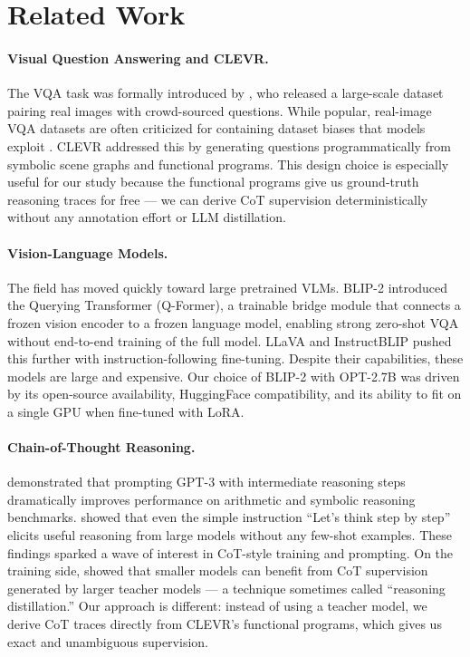 \documentclass[11pt,twocolumn]{article}
\begin{document}
\section{Related Work}

\paragraph{Visual Question Answering and CLEVR.}
The VQA task was formally introduced by \citet{antol2015vqa}, who released a large-scale dataset pairing real images with crowd-sourced questions. While popular, real-image VQA datasets are often criticized for containing dataset biases that models exploit \cite{johnson2017clevr}. CLEVR addressed this by generating questions programmatically from symbolic scene graphs and functional programs. This design choice is especially useful for our study because the functional programs give us ground-truth reasoning traces for free — we can derive CoT supervision deterministically without any annotation effort or LLM distillation.

\paragraph{Vision-Language Models.}
The field has moved quickly toward large pretrained VLMs. BLIP-2 \cite{li2023blip} introduced the Querying Transformer (Q-Former), a trainable bridge module that connects a frozen vision encoder to a frozen language model, enabling strong zero-shot VQA without end-to-end training of the full model. LLaVA \cite{liu2023llava} and InstructBLIP \cite{dai2023instructblip} pushed this further with instruction-following fine-tuning. Despite their capabilities, these models are large and expensive. Our choice of BLIP-2 with OPT-2.7B was driven by its open-source availability, HuggingFace compatibility, and its ability to fit on a single GPU when fine-tuned with LoRA.

\paragraph{Chain-of-Thought Reasoning.}
\citet{wei2022chain} demonstrated that prompting GPT-3 with intermediate reasoning steps dramatically improves performance on arithmetic and symbolic reasoning benchmarks. \citet{kojima2022large} showed that even the simple instruction ``Let's think step by step'' elicits useful reasoning from large models without any few-shot examples. These findings sparked a wave of interest in CoT-style training and prompting. On the training side, \citet{ho2022large} showed that smaller models can benefit from CoT supervision generated by larger teacher models — a technique sometimes called ``reasoning distillation.'' Our approach is different: instead of using a teacher model, we derive CoT traces directly from CLEVR's functional programs, which gives us exact and unambiguous supervision.
\end{document}
